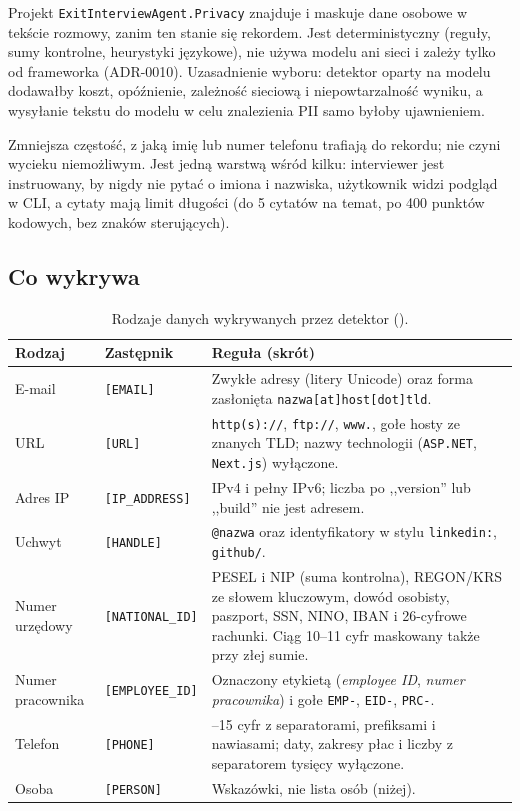 Projekt \texttt{ExitInterviewAgent.Privacy} znajduje i maskuje dane
osobowe w tekście rozmowy, zanim ten stanie się rekordem. Jest deterministyczny
(reguły, sumy kontrolne, heurystyki językowe), nie używa modelu ani sieci i
zależy tylko od frameworka (ADR-0010). Uzasadnienie wyboru: detektor oparty na
modelu dodawałby koszt, opóźnienie, zależność sieciową i niepowtarzalność
wyniku, a wysyłanie tekstu do modelu w celu znalezienia PII samo byłoby
ujawnieniem.

 Zmniejsza częstość, z jaką imię lub numer
telefonu trafiają do rekordu; nie czyni wycieku niemożliwym. Jest jedną
warstwą wśród kilku: interviewer jest instruowany, by nigdy nie pytać o
imiona i nazwiska, użytkownik widzi podgląd w CLI, a cytaty mają limit
długości (do 5 cytatów na temat, po 400 punktów kodowych, bez znaków
sterujących).

\subsection{Co wykrywa}

\begin{table}[htbp]
\centering
\small
\begin{tabularx}{\linewidth}{@{}>{\raggedright\arraybackslash}p{2.5cm}>{\raggedright\arraybackslash}p{2.5cm}>{\raggedright\arraybackslash}X@{}}
\toprule
\textbf{Rodzaj} & \textbf{Zastępnik} & \textbf{Reguła (skrót)} \\
\midrule
E-mail & \texttt{[EMAIL]} & Zwykłe adresy (litery Unicode) oraz forma zasłonięta \texttt{nazwa[at]host[dot]tld}. \\
URL & \texttt{[URL]} & \texttt{http(s)://}, \texttt{ftp://}, \texttt{www.}, gołe hosty ze znanych TLD; nazwy technologii (\texttt{ASP.NET}, \texttt{Next.js}) wyłączone. \\
Adres IP & \texttt{[IP\_ADDRESS]} & IPv4 i pełny IPv6; liczba po ,,version'' lub ,,build'' nie jest adresem. \\
Uchwyt & \texttt{[HANDLE]} & \texttt{@nazwa} oraz identyfikatory w stylu \texttt{linkedin:}, \texttt{github/}. \\
Numer urzędowy & \texttt{[NATIONAL\_ID]} & PESEL i NIP (suma kontrolna), REGON/KRS ze słowem kluczowym, dowód osobisty, paszport, SSN, NINO, IBAN i 26-cyfrowe rachunki. Ciąg 10--11 cyfr maskowany także przy złej sumie. \\
Numer pracownika & \texttt{[EMPLOYEE\_ID]} & Oznaczony etykietą (\emph{employee ID}, \emph{numer pracownika}) i gołe \texttt{EMP-}, \texttt{EID-}, \texttt{PRC-}. \\
Telefon & \texttt{[PHONE]} & 9--15 cyfr z separatorami, prefiksami i nawiasami; daty, zakresy płac i liczby z separatorem tysięcy wyłączone. \\
Osoba & \texttt{[PERSON]} & Wskazówki, nie lista osób (niżej). \\
\bottomrule
\end{tabularx}
\caption{Rodzaje danych wykrywanych przez detektor ().}
\label{tab:p3-pii}
\end{table}

